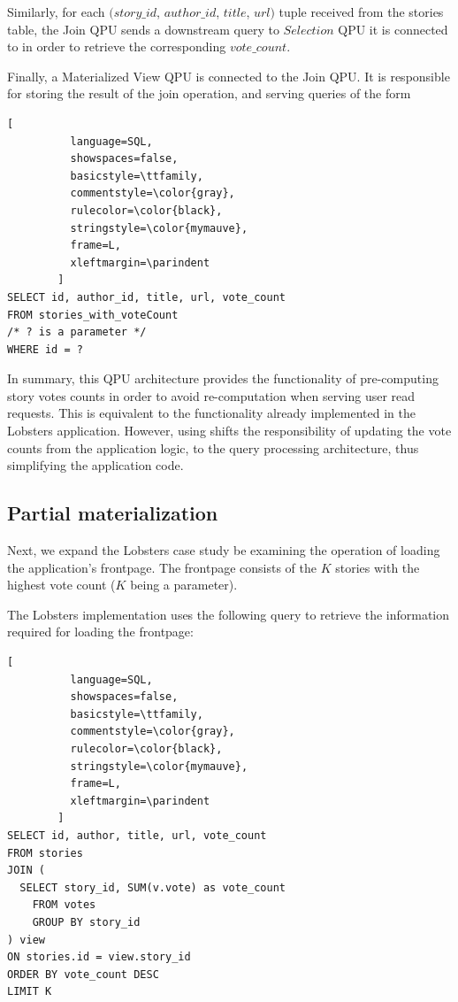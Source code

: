 Similarly, for each $(story\_id$, $author\_id$, $title$, $url)$ tuple received from the stories table,
the Join QPU sends a downstream query to $Selection$ QPU it is connected to in order to retrieve the corresponding $vote\_count$.

\medskip
\noindent
Finally, a Materialized View QPU is connected to the Join QPU.
It is responsible for storing the result of the join operation, and serving queries of the form

\begin{lstlisting}[
          language=SQL,
          showspaces=false,
          basicstyle=\ttfamily,
          commentstyle=\color{gray},
          rulecolor=\color{black},
          stringstyle=\color{mymauve},
          frame=L,
          xleftmargin=\parindent
        ]
SELECT id, author_id, title, url, vote_count
FROM stories_with_voteCount
/* ? is a parameter */
WHERE id = ?
\end{lstlisting}


\medskip
\noindent
In summary,
this QPU architecture provides the functionality of pre-computing story votes counts in order to avoid re-computation
when serving user read requests.
This is equivalent to the functionality already implemented in the Lobsters application.
However, using shifts the responsibility of updating the vote counts from the application logic,
to the query processing architecture, thus simplifying the application code.


\subsection{Partial materialization}

Next, we expand the Lobsters case study be examining the operation of loading the application's frontpage.
The frontpage consists of the $K$ stories with the highest vote count ($K$ being a parameter).

The Lobsters implementation uses the following query to retrieve the information required for loading the frontpage:

\begin{lstlisting}[
          language=SQL,
          showspaces=false,
          basicstyle=\ttfamily,
          commentstyle=\color{gray},
          rulecolor=\color{black},
          stringstyle=\color{mymauve},
          frame=L,
          xleftmargin=\parindent
        ]
SELECT id, author, title, url, vote_count
FROM stories
JOIN (
  SELECT story_id, SUM(v.vote) as vote_count
	FROM votes
	GROUP BY story_id
) view
ON stories.id = view.story_id
ORDER BY vote_count DESC
LIMIT K
\end{lstlisting}

